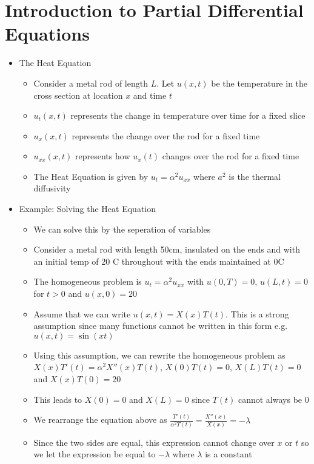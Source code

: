 \documentclass[12pt]{article}
\begin{document}
\section{Introduction to Partial Differential Equations}

\begin{itemize}
    \item The Heat Equation \begin{itemize}
        \item Consider a metal rod of length $L$. Let $u(x,t)$ be the temperature in the cross section at location $x$ and time $t$
        \item $u_t(x,t)$ represents the change in temperature over time for a fixed slice
        \item $u_x(x,t)$ represents the change over the rod for a fixed time
        \item $u_{xx}(x,t)$ represents how $u_x(t)$ changes over the rod for a fixed time
        \item The Heat Equation is given by $u_t = \alpha^2 u_{xx}$ where $a^2$ is the thermal diffusivity
    \end{itemize}
    \item Example: Solving the Heat Equation \begin{itemize}
        \item We can solve this by the seperation of variables
        \item Consider a metal rod with length 50cm, insulated on the ends and with an initial temp of 20 C throughout with the ends maintained at 0C
        \item The homogeneous problem is $u_t = \alpha^2 u_{xx}$ with $u(0, T) = 0$, $u(L,t) = 0$ for $t>0$ and $u(x,0) = 20$
        \item Assume that we can write $u(x,t) = X(x) T(t)$. This is a strong assumption since many functions cannot be written in this form e.g. $u(x,t) = \sin (xt)$
        \item Using this assumption, we can rewrite the homogeneous problem as $X(x) T'(t) = \alpha^2 X''(x) T(t)$, $X(0)T(t) = 0$, $X(L)T(t) = 0$ and $X(x)T(0) = 20$
        \item This leads to $X(0) = 0$ and $X(L) = 0$ since $T(t)$ cannot always be 0
        \item We rearrange the equation above as $\frac{T'(t)}{\alpha^2 T(t)} = \frac{X''(x)}{X(x)} = - \lambda$
        \item Since the two sides are equal, this expression cannot change over $x$ or $t$ so we let the expression be equal to $- \lambda$ where $\lambda$ is a constant

\end{itemize}
\end{itemize}
\end{document}

